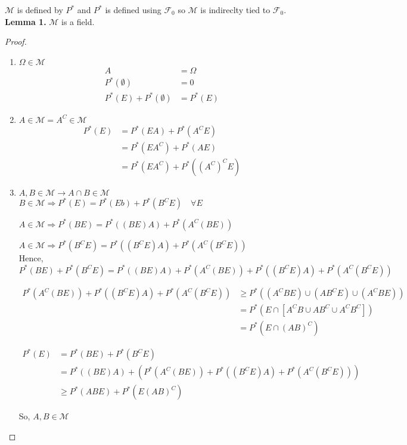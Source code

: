 \documentclass[11pt,fleqn]{book} %
\begin{document}
$\mathscr{M}$ is defined by $P^*$ and $P^*$ is defined using $\mathscr{F}_0$ so $\mathscr{M}$ is indireclty tied to $\mathscr{F}_0$.\\

\textbf{Lemma 1.} $\mathscr{M}$ is a field.

\begin{proof}


\begin{enumerate}[label = (\roman*)]
	\item $\Omega \in \mathscr{M}$\\

	$$\begin{aligned}
			A &= \Omega\\
			P^*(\emptyset) &= 0\\
			P^*(E) + P^*(\emptyset) &= P^*(E)
		\end{aligned}$$

	\item $A \in \mathscr{M} = A^C \in \mathscr{M}$\\

	$$\begin{aligned}
		P^*(E) &= P^*(EA) + P^*(A^C E)\\
		&= P^*(EA^C) + P^*(A E)\\
		&= P^*(EA^C) + P^*((A^C)^C E)
	\end{aligned}$$

	\item $A, B \in \mathscr{M} \rightarrow A \cap B \in \mathscr{M}$\\

	$B \in \mathscr{M} \Rightarrow P^*(E) = P^*(Eb) + P^*(B^C E) \quad \forall E$

	$A \in \mathscr{M} \Rightarrow P^*(BE) = P^*((BE)A) + P^*(A^C (BE))$

	$A \in \mathscr{M} \Rightarrow P^*(B^CE) = P^*((B^CE)A) + P^*(A^C (B^CE))$\\

	Hence, \\
	
	$$P^*(BE) + P^*(B^CE) = P^*((BE)A) + P^*(A^C (BE)) + P^*((B^CE)A) + P^*(A^C (B^CE))$$

	$$\begin{aligned}
		P^*(A^C (BE)) + P^*((B^CE)A) + P^*(A^C (B^CE)) &\geq P^*((A^C BE) \cup (AB^CE)\cup(A^CBE))\\
			&= P^*(E\cap[A^CB\cup  AB^C\cup A^CB^C])\\
			&= P^*(E \cap (AB)^C)
	\end{aligned} $$

	$$\begin{aligned}
		P^*(E) &= P^*(BE) + P^*(B^CE)\\
		&= P^*((BE)A) + (P^*(A^C (BE)) + P^*((B^CE)A) + P^*(A^C (B^CE)))\\
		&\geq P^*(ABE) + P^*(E(AB)^C)
	\end{aligned} $$
	
	 

	So, $A,B \in \mathscr{M}$
\end{enumerate}
\end{proof}
\end{document}
